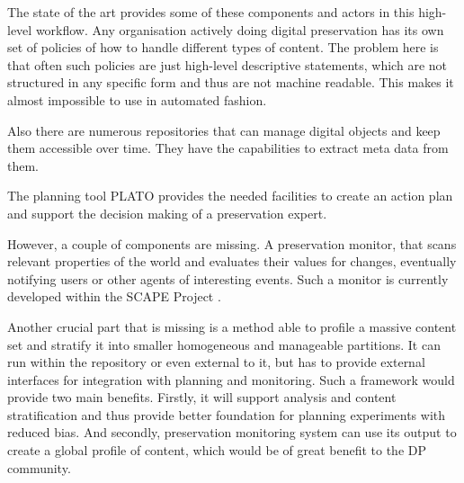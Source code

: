 The state of the art provides some of these components and actors in this high-level workflow. Any organisation actively doing digital preservation has its own set of policies of how to handle different types of content. The problem here is that often such policies are just high-level descriptive statements, which are not structured in any specific form and thus are not machine readable. This makes it almost impossible to use in automated fashion.

Also there are numerous repositories that can manage digital objects and keep them accessible over time. They have the capabilities to extract meta data from them.

The planning tool PLATO provides the needed facilities to create an action plan and support the decision making of a preservation expert.

However, a couple of components are missing. A preservation monitor, that scans relevant properties of the world and evaluates their values for changes, eventually notifying users or other agents of interesting events. Such a monitor is currently developed within the SCAPE Project \cite{becker-ipres2012}.

Another crucial part that is missing is a method able to profile a massive content set and stratify it into smaller homogeneous and manageable partitions. It can run within the repository or even external to it, but has to provide external interfaces for integration with planning and monitoring. Such a framework would provide two main benefits. Firstly, it will support analysis and content stratification and thus provide better foundation for planning experiments with reduced bias. And secondly, preservation monitoring system can use its output to create a global profile of content, which would be of great benefit to the DP community.